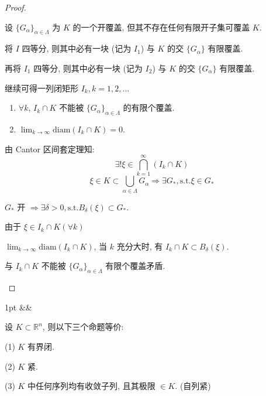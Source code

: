\documentclass[a4paper]{article}
\newcommand{\R}{\mathbb{R}}
\newcommand{\st}{,\text{s.t.}}
\newenvironment{theorem}[1][]{%
\def\FrameCommand{%
\hspace{1pt}%
{\color{theoremline}\vrule width 2pt}%
{\color{theoremshade}\vrule width 4pt}%
\colorbox{theoremshade}%
}%
\MakeFramed{\advance\hsize-\width\FrameRestore}%
\noindent
\hspace{-4.55pt}%
\begin{adjustwidth}{}{1pt}%
\setlength{\parindent}{0pt}%
\vspace{3pt}%
\ifx&#1&\else %
\textbf{#1}\par
\vspace{1pt}%
\fi }{%
\vspace{2pt}%
\end{adjustwidth}\endMakeFramed%
}
\begin{document}
\begin{proof}[Proof]
\begin{itemize}
                设 $\{G_{\alpha}\}_{\alpha \in \Lambda}$ 为 $K$ 的一个开覆盖, 但其不存在任何有限开子集可覆盖
                $K$.

                将 $I$ 四等分, 则其中必有一块 (记为 $I_{1}$) 与 $K$ 的交
                $\{G_{\alpha}\}$ 有限覆盖.

                再将 $I_{1}$ 四等分, 则其中必有一块 (记为 $I_{2}$) 与 $K$ 的交 $\{
                G_{\alpha}\}$ 有限覆盖.

                继续可得一列闭矩形 $I_{k}, k=1,2,\dots$

                \begin{enumerate}
                    \item $\forall k$, $I_{k}\cap K$ 不能被
                        $\{G_{\alpha}\}_{\alpha \in \Lambda}$ 的有限个覆盖.

                    \item $\lim_{k \to \infty}\text{diam}(I_{k}\cap K) = 0$.
                \end{enumerate}

                由 Cantor 区间套定理知:
                \[
                    \exists ! \xi \in \bigcap_{k=1}^{\infty}(I_{k}\cap K)
                \]
                \[
                    \xi \in K \subset \bigcup_{\alpha \in \Lambda}G_{\alpha}\Rightarrow
                    \exists G_{*}\st \xi \in G_{*}
                \]

                $G_{*}$ 开 $\Rightarrow \exists \delta > 0 \st B_{\delta}(\xi) \subset
                G_{*}$.

                由于 $\xi \in I_{k}\cap K (\forall k)$

                $\lim_{k \to \infty}\text{diam}(I_{k}\cap K)$, 当 $k$ 充分大时,
                有 $I_{k}\cap K \subset B_{\delta}(\xi)$.

                与 $I_{k}\cap K$ 不能被 $\{G_{\alpha}\}_{\alpha \in \Lambda}$
                有限个覆盖矛盾.
        \end{itemize}
    \end{proof}

    \begin{theorem}
        设 $K \subset \R^{n}$, 则以下三个命题等价:

        (1) $K$ 有界闭.

        (2) $K$ 紧.

        (3) $K$ 中任何序列均有收敛子列, 且其极限 $\in K$. (自列紧)
    \end{theorem}
\end{document}
